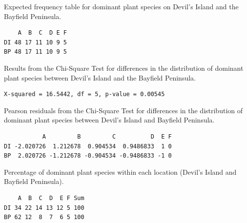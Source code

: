 \documentclass[10pt,openany]{book}\usepackage[]{graphicx}\usepackage[]{color}
\makeatletter
\newenvironment{kframe}{%
 \def\at@end@of@kframe{}%
 \ifinner\ifhmode%
  \def\at@end@of@kframe{\end{minipage}}%
  \begin{minipage}{\columnwidth}%
 \fi\fi%
 \def\FrameCommand##1{\hskip\@totalleftmargin \hskip-\fboxsep
 \colorbox{shadecolor}{##1}\hskip-\fboxsep
     \hskip-\linewidth \hskip-\@totalleftmargin \hskip\columnwidth}%
 \MakeFramed {\advance\hsize-\width
   \@totalleftmargin\z@ \linewidth\hsize
   \@setminipage}}%
 {\par\unskip\endMakeFramed%
 \at@end@of@kframe}
\newenvironment{knitrout}{}{} %
\makeatother
\begin{document}
\begin{table}[h]
  \caption{Expected frequency table for dominant plant species on Devil's Island and the Bayfield Peninsula.}
  \label{tab:ChiAIexp}
  \vspace{-12pt}
\begin{knitrout}
\color{fgcolor}\begin{kframe}
\begin{verbatim}
    A  B  C  D E F
DI 48 17 11 10 9 5
BP 48 17 11 10 9 5
\end{verbatim}
\end{kframe}
\end{knitrout}
\end{table}

\begin{table}[h]
  \caption{Results from the Chi-Square Test for differences in the distribution of dominant plant species between Devil's Island and the Bayfield Peninsula.}
  \label{tab:ChiAIchi}
  \vspace{-12pt}
\begin{knitrout}
\color{fgcolor}\begin{kframe}
\begin{verbatim}
X-squared = 16.5442, df = 5, p-value = 0.00545
\end{verbatim}
\end{kframe}
\end{knitrout}
\end{table}

\begin{table}[h]
  \caption{Pearson residuals from the Chi-Square Test for differences in the distribution of dominant plant species between Devil's Island and Bayfield Peninsula.}
  \label{tab:ChiAIres}
  \vspace{-12pt}
\begin{knitrout}
\color{fgcolor}\begin{kframe}
\begin{verbatim}
           A         B         C          D  E F
DI -2.020726  1.212678  0.904534  0.9486833  1 0
BP  2.020726 -1.212678 -0.904534 -0.9486833 -1 0
\end{verbatim}
\end{kframe}
\end{knitrout}
\end{table}

\begin{table}[h]
  \caption{Percentage of dominant plant species within each location (Devil's Island and Bayfield Peninsula).}
  \label{tab:ChiAIrow}
  \vspace{-12pt}
\begin{knitrout}
\color{fgcolor}\begin{kframe}
\begin{verbatim}
    A  B  C  D  E F Sum
DI 34 22 14 13 12 5 100
BP 62 12  8  7  6 5 100
\end{verbatim}
\end{kframe}
\end{knitrout}
\end{table}
\end{document}
